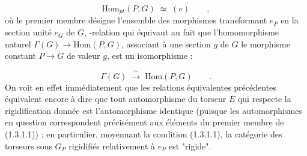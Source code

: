 \begin{equation}\tag{1.3.1.1}
\mathrm{Hom}_{pt}(P,G) \;\simeq\; (e) \qquad ,
\end{equation}
où le premier membre désigne l'ensemble des morphismes transformant $e_P$ en la section unité $e_G$ de $G$, -relation qui équivaut au fait que l'homomorphisme naturel $\Gamma(G) \longrightarrow \mathrm{Hom}(P,G)$, associant à une section $g$ de $G$ le morphisme constant $P \longrightarrow G$ de valeur $g$, est un isomorphisme :

\begin{equation}\tag{1.3.1.2}
\Gamma(G) \;\xrightarrow{\;\sim\;}\; \mathrm{Hom}(P,G) \qquad .
\end{equation}
On voit en effet immédiatement que les relations équivalentes précédentes équivalent encore à dire que tout automorphisme du torseur $E$ qui respecte la rigidification donnée est l'automorphisme identique (puisque les automorphismes en question correspondent précisément aux éléments du premier membre de (1.3.1.1)) ; en particulier, moyennant la condition (1.3.1.1), la catégorie des torseurs sous $G_P$ rigidifiés relativement à $e_P$ est "rigide".

